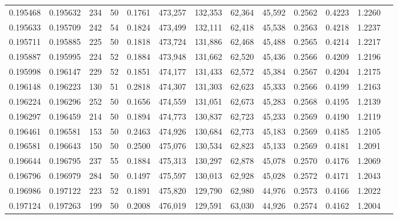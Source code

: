 \begin{tabular}{rrrrrrrrrrrrr}
0.195468 & 0.195632 &   234 &  50 &                                     0.1761 & 473,257 & 132,353 &  62,364 &  45,592 & 0.2562 & 0.4223 & 1.2260 \\
0.195633 & 0.195709 &   242 &  54 &                                     0.1824 & 473,499 & 132,111 &  62,418 &  45,538 & 0.2563 & 0.4218 & 1.2237 \\
0.195711 & 0.195885 &   225 &  50 &                                     0.1818 & 473,724 & 131,886 &  62,468 &  45,488 & 0.2565 & 0.4214 & 1.2217 \\
0.195887 & 0.195995 &   224 &  52 &                                     0.1884 & 473,948 & 131,662 &  62,520 &  45,436 & 0.2566 & 0.4209 & 1.2196 \\
0.195998 & 0.196147 &   229 &  52 &                                     0.1851 & 474,177 & 131,433 &  62,572 &  45,384 & 0.2567 & 0.4204 & 1.2175 \\
0.196148 & 0.196223 &   130 &  51 &                                     0.2818 & 474,307 & 131,303 &  62,623 &  45,333 & 0.2566 & 0.4199 & 1.2163 \\
0.196224 & 0.196296 &   252 &  50 &                                     0.1656 & 474,559 & 131,051 &  62,673 &  45,283 & 0.2568 & 0.4195 & 1.2139 \\
0.196297 & 0.196459 &   214 &  50 &                                     0.1894 & 474,773 & 130,837 &  62,723 &  45,233 & 0.2569 & 0.4190 & 1.2119 \\
0.196461 & 0.196581 &   153 &  50 &                                     0.2463 & 474,926 & 130,684 &  62,773 &  45,183 & 0.2569 & 0.4185 & 1.2105 \\
0.196581 & 0.196643 &   150 &  50 &                                     0.2500 & 475,076 & 130,534 &  62,823 &  45,133 & 0.2569 & 0.4181 & 1.2091 \\
0.196644 & 0.196795 &   237 &  55 &                                     0.1884 & 475,313 & 130,297 &  62,878 &  45,078 & 0.2570 & 0.4176 & 1.2069 \\
0.196796 & 0.196979 &   284 &  50 &                                     0.1497 & 475,597 & 130,013 &  62,928 &  45,028 & 0.2572 & 0.4171 & 1.2043 \\
0.196986 & 0.197122 &   223 &  52 &                                     0.1891 & 475,820 & 129,790 &  62,980 &  44,976 & 0.2573 & 0.4166 & 1.2022 \\
0.197124 & 0.197263 &   199 &  50 &                                     0.2008 & 476,019 & 129,591 &  63,030 &  44,926 & 0.2574 & 0.4162 & 1.2004 \\

\end{tabular}
